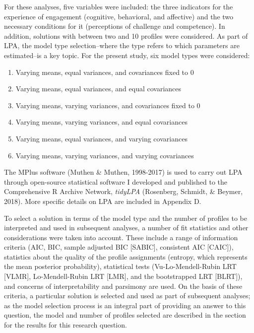 \documentclass[]{msu-thesis}
\providecommand{\tightlist}{%
  \setlength{\itemsep}{0pt}\setlength{\parskip}{0pt}}
\theoremstyle{definition}
\theoremstyle{definition}
\theoremstyle{definition}
\theoremstyle{remark}
\begin{document}
For these analyses, five variables were included: the three indicators
for the experience of engagement (cognitive, behavioral, and affective)
and the two necessary conditions for it (perceptions of challenge and
competence). In addition, solutions with between two and 10 profiles
were considered. As part of LPA, the model type selection--where the
type refers to which parameters are estimated--is a key topic. For the
present study, six model types were considered:

\begin{enumerate}
\def\labelenumi{\arabic{enumi}.}
\tightlist
\item
  Varying means, equal variances, and covariances fixed to 0
\item
  Varying means, equal variances, and equal covariances
\item
  Varying means, varying variances, and covariances fixed to 0
\item
  Varying means, varying variances, and equal covariances
\item
  Varying means, equal variances, and varying covariances
\item
  Varying means, varying variances, and varying covariances
\end{enumerate}

The MPlus software (Muthen \& Muthen, 1998-2017) is used to carry out
LPA through open-source statistical software I developed and published
to the Comprehensive R Archive Network, \emph{tidyLPA} (Rosenberg,
Schmidt, \& Beymer, 2018). More specific details on LPA are included in
Appendix D.

To select a solution in terms of the model type and the number of
profiles to be interpreted and used in subsequent analyses, a number of
fit statistics and other considerations were taken into account. These
include a range of information criteria (AIC, BIC, sample adjusted BIC
{[}SABIC{]}, consistent AIC {[}CAIC{]}), statistics about the quality of
the profile assignments (entropy, which represents the mean posterior
probability), statistical tests (Vu-Lo-Mendell-Rubin LRT {[}VLMR{]},
Lo-Mendell-Rubin LRT {[}LMR{]}, and the bootstrapped LRT {[}BLRT{]}),
and concerns of interpretability and parsimony are used. On the basis of
these criteria, a particular solution is selected and used as part of
subsequent analyses; as the model selection process is an integral part
of providing an answer to this question, the model and number of
profiles selected are described in the section for the results for this
research question.
\end{document}
